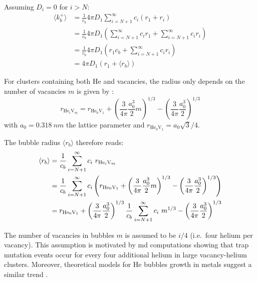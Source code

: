 Assuming $D_i = 0$ for $i > N$:
\begin{subequations}
    \begin{align}
        \langle k_b^+ \rangle &= \frac{1}{c_b} 4 \pi D_1  \sum\limits_{i=N+1}^\infty c_i (r_1 + r_i) \\
        &= \frac{1}{c_b} 4 \pi D_1 \left(\sum\limits_{i=N+1}^\infty c_i r_1 + \sum\limits_{i=N+1}^\infty c_i r_i \right)\\
        &= \frac{1}{c_b} 4 \pi D_1 \left(r_1 c_b  + \sum\limits_{i=N+1}^\infty c_i r_i \right)\\
        &= 4 \pi D_1 (r_1 + \langle r_b \rangle) 
    \end{align}
\end{subequations}

For clusters containing both \gls{He} and vacancies, the radius only depends on the number of vacancies $m$ is given by \cite{faney_spatially_2015}:
\begin{equation}
    r_{\mathrm{He}_i\mathrm{V}_m} = r_{\mathrm{He}_0 \mathrm{V}_1} + \left(\frac{3}{4 \pi} \frac{a_0^3}{2} m \right)^{1/3} - \left(\frac{3}{4 \pi} \frac{a_0^3}{2} \right)^{1/3}
\end{equation}
with $a_0 = \SI{0.318}{nm}$ the lattice parameter and $r_{\mathrm{He}_0 \mathrm{V}_1} =  a_0 \sqrt{3}/4$.


The bubble radius $\langle r_b \rangle$ therefore reads:
\begin{subequations}
    \begin{align}
        \langle r_b \rangle &=  \frac{1}{c_b}\sum\limits_{i=N+1}^\infty  c_i \ r_{\mathrm{He}_i\mathrm{V}_m}\\
        &= \frac{1}{c_b}\sum\limits_{i=N+1}^\infty c_i \left( r_{\mathrm{He}_0 \mathrm{V}_1} + \left(\frac{3}{4 \pi} \frac{a_0^3}{2} m \right)^{1/3} - \left(\frac{3}{4 \pi} \frac{a_0^3}{2} \right)^{1/3} \right)\\
        &= r_{\mathrm{He}_0 \mathrm{V}_1} + \left(\frac{3}{4 \pi} \frac{a_0^3}{2} \right)^{1/3} \frac{1}{c_b}\sum\limits_{i=N+1}^\infty c_i \ m^{1/3} - \left(\frac{3}{4 \pi} \frac{a_0^3}{2} \right)^{1/3}
    \end{align}
    \labeq{radius average}
\end{subequations}

The number of vacancies in bubbles $m$ is assumed to be $i/4$ (i.e.\ four helium per vacancy).
This assumption is motivated by \gls{md} computations showing that \gls{trap mutation} events occur for every four additional helium in large \gls{vacancy}-helium clusters.
Moreover, theoretical models for He bubbles growth in metals suggest a similar trend .

